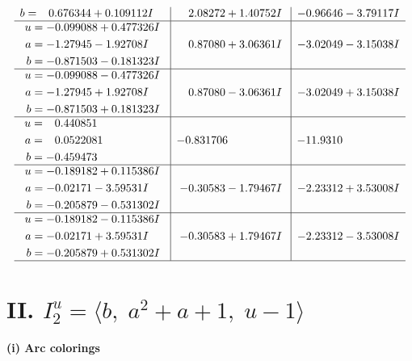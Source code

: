 \documentclass[1p]{elsarticle_modified}
\theoremstyle{definition}
\begin{document}
$$\begin{array}{c|c|c}
\begin{aligned}
b &= \phantom{-}0.676344 + 0.109112 I\end{aligned}
 & \phantom{-}2.08272 + 1.40752 I & -0.96646 - 3.79117 I \\ \hline\begin{aligned}
u &= -0.099088 + 0.477326 I \\
a &= -1.27945 - 1.92708 I \\
b &= -0.871503 - 0.181323 I\end{aligned}
 & \phantom{-}0.87080 + 3.06361 I & -3.02049 - 3.15038 I \\ \hline\begin{aligned}
u &= -0.099088 - 0.477326 I \\
a &= -1.27945 + 1.92708 I \\
b &= -0.871503 + 0.181323 I\end{aligned}
 & \phantom{-}0.87080 - 3.06361 I & -3.02049 + 3.15038 I \\ \hline\begin{aligned}
u &= \phantom{-}0.440851\phantom{ +0.000000I} \\
a &= \phantom{-}0.0522081\phantom{ +0.000000I} \\
b &= -0.459473\phantom{ +0.000000I}\end{aligned}
 & -0.831706\phantom{ +0.000000I} & -11.9310\phantom{ +0.000000I} \\ \hline\begin{aligned}
u &= -0.189182 + 0.115386 I \\
a &= -0.02171 - 3.59531 I \\
b &= -0.205879 - 0.531302 I\end{aligned}
 & -0.30583 - 1.79467 I & -2.23312 + 3.53008 I \\ \hline\begin{aligned}
u &= -0.189182 - 0.115386 I \\
a &= -0.02171 + 3.59531 I \\
b &= -0.205879 + 0.531302 I\end{aligned}
 & -0.30583 + 1.79467 I & -2.23312 - 3.53008 I\\
 \hline 
 \end{array}$$\newpage\newpage\renewcommand{\arraystretch}{1}
\centering \section*{II. $I^u_{2}= \langle b,\;a^2+a+1,\;u-1 \rangle$}
\flushleft \textbf{(i) Arc colorings}\\
\end{document}
